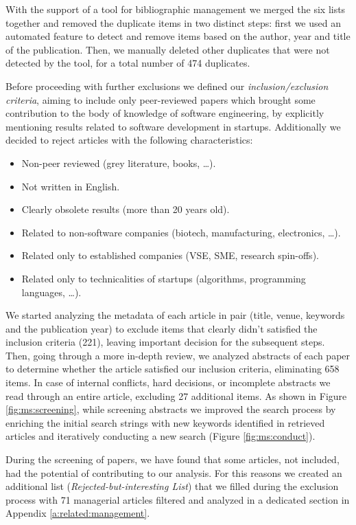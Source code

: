 \documentclass[final,5p,times,twocolumn]{elsarticle}
\begin{document}
With the support of a tool for bibliographic management \cite{bibdesk} we merged the six lists together and removed the duplicate items in two distinct steps: first we used an automated feature to detect and remove items based on the author, year and title of the publication. Then, we manually deleted other duplicates that were not detected by the tool, for a total number of 474 duplicates.

Before proceeding with further exclusions we defined our \textit{inclusion/exclusion criteria}, aiming to include only peer-reviewed papers which brought some contribution to the body of knowledge of software engineering, by explicitly mentioning results related to software development in startups.
Additionally we decided to reject articles with the following characteristics:


\begin{itemize}

\item Non-peer reviewed (grey literature, books, \ldots).
\item Not written in English.
\item Clearly obsolete results (more than 20 years old).

\item Related to non-software companies (biotech, manufacturing, electronics, \ldots).
\item Related only to established companies (VSE, SME, research spin-offs).
\item Related only to technicalities of startups (algorithms, programming languages, \ldots).
\end{itemize}

We started analyzing the metadata of each article in pair (title, venue, keywords and the publication year) to exclude items that clearly didn’t satisfied the inclusion criteria (221), leaving important decision for the subsequent steps. Then, going through a more in-depth review, we analyzed abstracts of each paper to determine whether the article satisfied our inclusion criteria, eliminating 658 items. In case of internal conflicts, hard decisions, or incomplete abstracts we read through an entire article, excluding 27 additional items. As shown in Figure \ref{fig:ms:screening}, while screening abstracts we improved the search process by enriching the initial search strings with new keywords identified in retrieved articles and iteratively conducting a new search (Figure \ref{fig:ms:conduct}).

During the screening of papers, we have found that some articles, not included, had the potential of contributing to our analysis. For this reasons we created an additional list (\textit{Rejected-but-interesting List}) that we filled during the exclusion process with 71 managerial articles filtered and analyzed in a dedicated section in Appendix \ref{a:related:management}.
\end{document}
